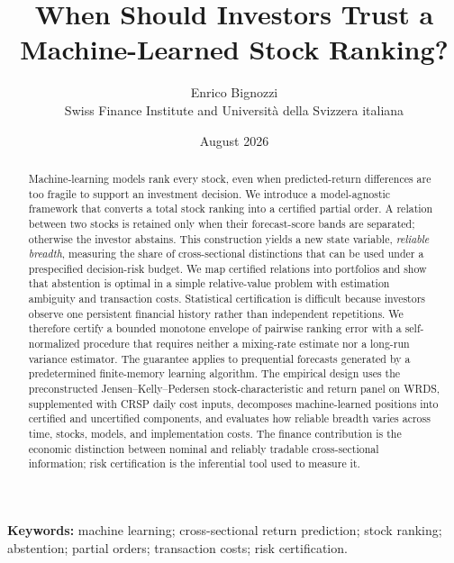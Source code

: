 \documentclass[11pt]{article}
\title{\textbf{When Should Investors Trust a Machine-Learned Stock Ranking?}}
\author{Enrico Bignozzi\\Swiss Finance Institute and Universit\`a della Svizzera italiana}
\date{August 2026}
\theoremstyle{definition}
\theoremstyle{remark}
\begin{document}
\maketitle

\begin{center}
\end{center}

\begin{abstract}
Machine-learning models rank every stock, even when predicted-return differences are too fragile to support an investment decision. We introduce a model-agnostic framework that converts a total stock ranking into a certified partial order. A relation between two stocks is retained only when their forecast-score bands are separated; otherwise the investor abstains. This construction yields a new state variable, \emph{reliable breadth}, measuring the share of cross-sectional distinctions that can be used under a prespecified decision-risk budget. We map certified relations into portfolios and show that abstention is optimal in a simple relative-value problem with estimation ambiguity and transaction costs. Statistical certification is difficult because investors observe one persistent financial history rather than independent repetitions. We therefore certify a bounded monotone envelope of pairwise ranking error with a self-normalized procedure that requires neither a mixing-rate estimate nor a long-run variance estimator. The guarantee applies to prequential forecasts generated by a predetermined finite-memory learning algorithm. The empirical design uses the preconstructed Jensen--Kelly--Pedersen stock-characteristic and return panel on WRDS, supplemented with CRSP daily cost inputs, decomposes machine-learned positions into certified and uncertified components, and evaluates how reliable breadth varies across time, stocks, models, and implementation costs. The finance contribution is the economic distinction between nominal and reliably tradable cross-sectional information; risk certification is the inferential tool used to measure it.
\end{abstract}

\noindent\textbf{Keywords:} machine learning; cross-sectional return prediction; stock ranking; abstention; partial orders; transaction costs; risk certification.









\appendix




\end{document}
